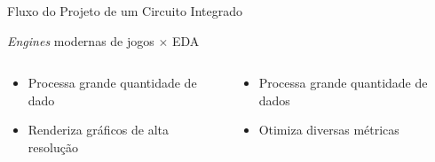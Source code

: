 \begin{frame}{Fluxo do Projeto de um Circuito Integrado}
    
    
    \begin{center}
    \end{center}
    
\end{frame}

\begin{frame}{ \textit{Engines} modernas de jogos $\times$ EDA }


\begin{columns}
\begin{column}{0.5\textwidth}
    \begin{center}
    \begin{itemize}
        \item Processa grande quantidade de dado
        \item Renderiza gráficos de alta resolução
    \end{itemize}
    \end{center}
\end{column}
\begin{column}{0.5\textwidth} 
    \begin{center}
        \begin{itemize}
        \item Processa grande quantidade de dados
        \item Otimiza diversas métricas
    \end{itemize}
     \end{center}
\end{column}
\end{columns}

\end{frame}

